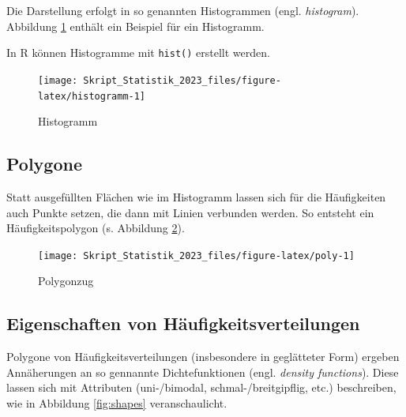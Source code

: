 \documentclass[
  11pt,
  ngerman,
  a4paper,
]{report}
\newenvironment{rtip}{
  \medskip
  \begin{tcolorbox}[colframe=purple,colback=light_gray,title=Softwarehinweis]
}{
  \end{tcolorbox}
  \medskip
}
\begin{document}
Die Darstellung erfolgt in so genannten Histogrammen (engl. \emph{histogram}). Abbildung \ref{fig:histogramm} enthält ein Beispiel für ein Histogramm.

\begin{rtip}
In R können Histogramme mit \verb|hist()| erstellt werden.
\end{rtip}

\begin{figure}[!h]

{\centering \texttt{[image: Skript\_Statistik\_2023\_files/figure-latex/histogramm-1]} 

}

\caption{Histogramm}\label{fig:histogramm}
\end{figure}

\hypertarget{polygone}{%
\subsection{Polygone}\label{polygone}}

Statt ausgefüllten Flächen wie im Histogramm lassen sich für die Häufigkeiten auch Punkte setzen, die dann mit Linien verbunden werden. So entsteht ein Häufigkeitspolygon (s. Abbildung \ref{fig:poly}).

\begin{figure}[!h]

{\centering \texttt{[image: Skript\_Statistik\_2023\_files/figure-latex/poly-1]} 

}

\caption{Polygonzug}\label{fig:poly}
\end{figure}

\hypertarget{eigenschaften-von-huxe4ufigkeitsverteilungen}{%
\subsection{Eigenschaften von Häufigkeitsverteilungen}\label{eigenschaften-von-huxe4ufigkeitsverteilungen}}

Polygone von Häufigkeitsverteilungen (insbesondere in geglätteter Form) ergeben Annäherungen an so gennannte Dichtefunktionen (engl. \emph{density functions}). Diese lassen sich mit Attributen (uni-/bimodal, schmal-/breitgipflig, etc.) beschreiben, wie in Abbildung \ref{fig:shapes} veranschaulicht.
\end{document}
